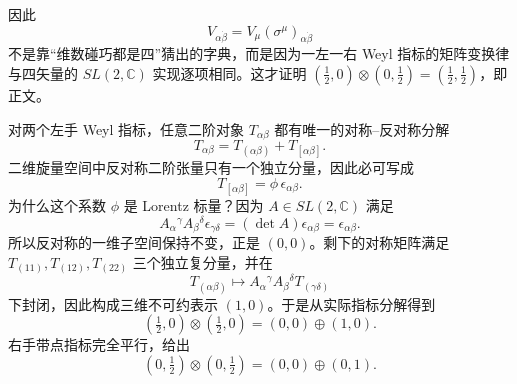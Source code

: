 \begin{derivation}
因此
\begin{equation*}
 V_{\alpha\dot\beta}=V_\mu(\sigma^\mu)_{\alpha\dot\beta}
\end{equation*}
不是靠“维数碰巧都是四”猜出的字典，而是因为一左一右 Weyl 指标的矩阵变换律与四矢量的 $SL(2,\mathbb C)$ 实现逐项相同。这才证明
$(\tfrac12,0)\otimes(0,\tfrac12)=(\tfrac12,\tfrac12)$，即正文。
\end{derivation}

\begin{derivation}
对两个左手 Weyl 指标，任意二阶对象 $T_{\alpha\beta}$ 都有唯一的对称--反对称分解
\begin{equation*}
 T_{\alpha\beta}=T_{(\alpha\beta)}+T_{[\alpha\beta]}.
\end{equation*}
二维旋量空间中反对称二阶张量只有一个独立分量，因此必可写成
\begin{equation*}
 T_{[\alpha\beta]}=\phi\,\epsilon_{\alpha\beta}.
\end{equation*}
为什么这个系数 $\phi$ 是 Lorentz 标量？因为 $A\in SL(2,\mathbb C)$ 满足
\begin{equation*}
 A_\alpha{}^\gamma A_\beta{}^\delta
 \epsilon_{\gamma\delta}
 =(\det A)\epsilon_{\alpha\beta}
 =\epsilon_{\alpha\beta}.
\end{equation*}
所以反对称的一维子空间保持不变，正是 $(0,0)$。剩下的对称矩阵满足
$T_{(11)},T_{(12)},T_{(22)}$ 三个独立复分量，并在
\begin{equation*}
 T_{(\alpha\beta)}\longmapsto
 A_\alpha{}^\gamma A_\beta{}^\delta
 T_{(\gamma\delta)}
\end{equation*}
下封闭，因此构成三维不可约表示 $(1,0)$。于是从实际指标分解得到
\begin{equation*}
 (\tfrac12,0)\otimes(\tfrac12,0)
 =(0,0)\oplus(1,0).
\end{equation*}
右手带点指标完全平行，给出
\begin{equation*}
 (0,\tfrac12)\otimes(0,\tfrac12)
 =(0,0)\oplus(0,1).
\end{equation*}


\end{derivation}

